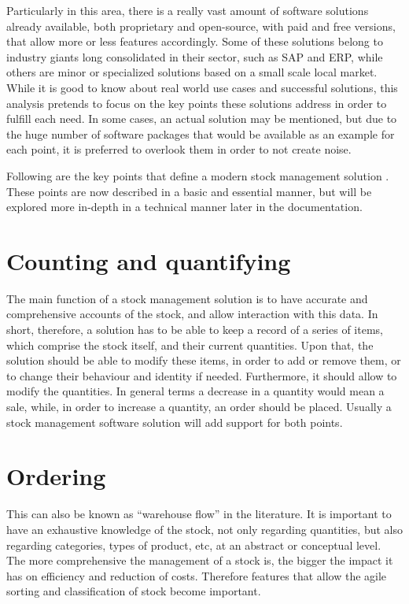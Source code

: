 Particularly in this area, there is a really vast amount of software solutions already available, both proprietary and open-source, with paid and free versions, that allow more or less features accordingly. Some of these solutions belong to industry giants long consolidated in their sector, such as SAP and ERP, while others are minor or specialized solutions based on a small scale local market.
While it is good to know about real world use cases and successful solutions, this analysis pretends to focus on the key points these solutions address in order to fulfill each need. In some cases, an actual solution may be mentioned, but due to the huge number of software packages that would be available as an example for each point, it is preferred to overlook them in order to not create noise.

Following are the key points that define a modern stock management solution \cite{5}. These points are now described in a basic and essential manner, but will be explored more in-depth in a technical manner later in the documentation.

\section{Counting and quantifying}
The main function of a stock management solution is to have accurate and comprehensive accounts of the stock, and allow interaction with this data. In short, therefore, a solution has to be able to keep a record of a series of items, which comprise the stock itself, and their current quantities.
Upon that, the solution should be able to modify these items, in order to add or remove them, or to change their behaviour and identity if needed.
Furthermore, it should allow to modify the quantities. In general terms a decrease in a quantity would mean a sale, while, in order to increase a quantity, an order should be placed. Usually a stock management software solution will add support for both points.
\section{Ordering}
This can also be known as “warehouse flow” in the literature. It is important to have an exhaustive knowledge of the stock, not only regarding quantities, but also regarding categories, types of product, etc, at an abstract or conceptual level. The more comprehensive the management of a stock is, the bigger the impact it has on efficiency and reduction of costs. Therefore features that allow the agile sorting and classification of stock become important.
